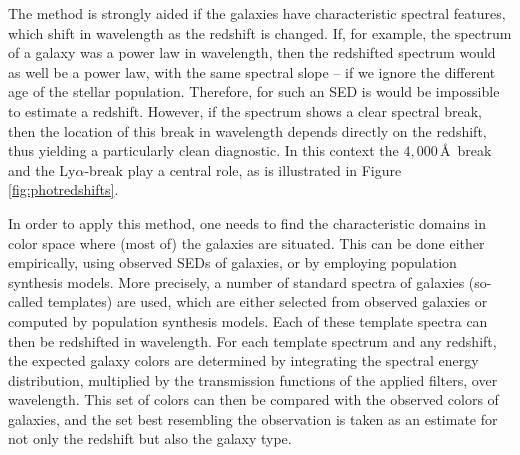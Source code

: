 \documentclass[a4paper,10pt]{article}
\begin{document}
{\noindent}The method is strongly aided if the galaxies have characteristic spectral features, which shift in wavelength as the redshift is changed. If, for example, the spectrum of a galaxy was a power law in wavelength, then the redshifted spectrum would as well be a power law, with the same spectral slope -- if we ignore the different age of the stellar population. Therefore, for such an SED is would be impossible to estimate a redshift. However, if the spectrum shows a clear spectral break, then the location of this break in wavelength depends directly on the redshift, thus yielding a particularly clean diagnostic. In this context the $4,000$\,\AA~break and the Ly$\alpha$-break play a central role, as is illustrated in Figure \ref{fig:photredshifts}.

{\noindent}In order to apply this method, one needs to find the characteristic domains in color space where (most of) the galaxies are situated. This can be done either empirically, using observed SEDs of galaxies, or by employing population synthesis models. More precisely, a number of standard spectra of galaxies (so-called templates) are used, which are either selected from observed galaxies or computed by population synthesis models. Each of these template spectra can then be redshifted in wavelength. For each template spectrum and any redshift, the expected galaxy colors are determined by integrating the spectral energy distribution, multiplied by the transmission functions of the applied filters, over wavelength. This set of colors can then be compared with the observed colors of galaxies, and the set best resembling the observation is taken as an estimate for not only the redshift but also the galaxy type.
\end{document}

